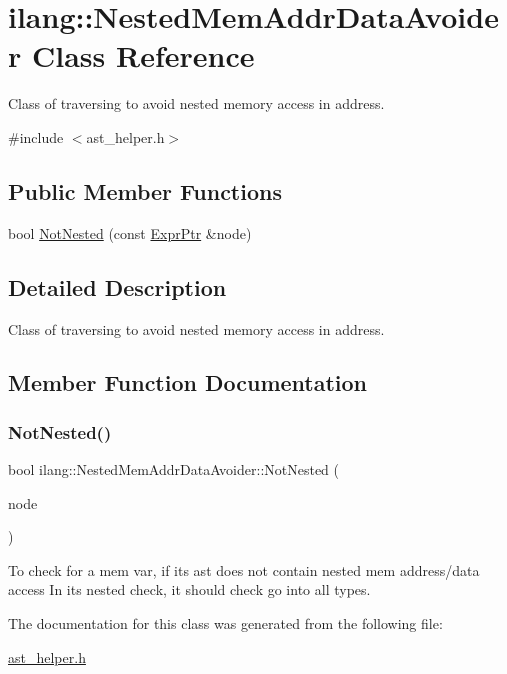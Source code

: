 \hypertarget{classilang_1_1_nested_mem_addr_data_avoider}{}\section{ilang\+:\+:Nested\+Mem\+Addr\+Data\+Avoider Class Reference}
\label{classilang_1_1_nested_mem_addr_data_avoider}


Class of traversing to avoid nested memory access in address.  




{\ttfamily \#include $<$ast\+\_\+helper.\+h$>$}

\subsection*{Public Member Functions}
\begin{DoxyCompactItemize}
\item 
bool \mbox{\hyperlink{classilang_1_1_nested_mem_addr_data_avoider_a4a3d3317a3ebfbc7c7958bff6333d6e9}{Not\+Nested}} (const \mbox{\hyperlink{namespaceilang_a7c4196c72e53ea4df4b7861af7bc3bce}{Expr\+Ptr}} \&node)
\end{DoxyCompactItemize}


\subsection{Detailed Description}
Class of traversing to avoid nested memory access in address. 

\subsection{Member Function Documentation}
\mbox{\label{classilang_1_1_nested_mem_addr_data_avoider_a4a3d3317a3ebfbc7c7958bff6333d6e9}} 
\subsubsection{\texorpdfstring{Not\+Nested()}{NotNested()}}
{\footnotesize\ttfamily bool ilang\+::\+Nested\+Mem\+Addr\+Data\+Avoider\+::\+Not\+Nested (\begin{DoxyParamCaption}\item[{const \mbox{\hyperlink{namespaceilang_a7c4196c72e53ea4df4b7861af7bc3bce}{Expr\+Ptr}} \&}]{node }\end{DoxyParamCaption})}

To check for a mem var, if its ast does not contain nested mem address/data access In its nested check, it should check go into all types. 

The documentation for this class was generated from the following file\+:\begin{DoxyCompactItemize}
\item 
\mbox{\hyperlink{ast__helper_8h}{ast\+\_\+helper.\+h}}\end{DoxyCompactItemize}

